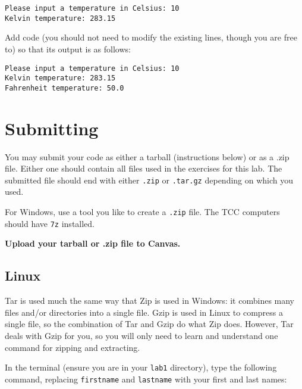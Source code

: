 \documentclass[12pt,hidelinks]{article}
\begin{document}
\begin{lstlisting}[style=bash]
Please input a temperature in Celsius: 10
Kelvin temperature: 283.15
\end{lstlisting}

Add code (you should not need to modify the existing lines, though you are free to) so that its output is as follows:

\begin{lstlisting}[style=bash]
Please input a temperature in Celsius: 10
Kelvin temperature: 283.15
Fahrenheit temperature: 50.0
\end{lstlisting}



\section{Submitting}

You may submit your code as either a tarball (instructions below) or as a .zip file. Either one should contain all files used in the exercises for this lab. The submitted file should end with either \texttt{.zip} or \texttt{.tar.gz} depending on which you used.

For Windows, use a tool you like to create a \texttt{.zip} file. The TCC computers should
have \texttt{7z} installed.

\begin{center}
  \textbf{Upload your tarball or .zip file to Canvas.}
\end{center}

\subsection{Linux}

Tar is used much the same way that Zip is used in Windows: it combines many files and/or directories into a single file. Gzip is used in Linux to compress a single file, so the combination of Tar and Gzip do what Zip does. However, Tar deals with Gzip for you, so you will only need to learn and understand one command for zipping and extracting.

In the terminal (ensure you are in your \texttt{lab1} directory), type the following command, replacing \texttt{firstname} and \texttt{lastname} with your first and last names:
\end{document}
